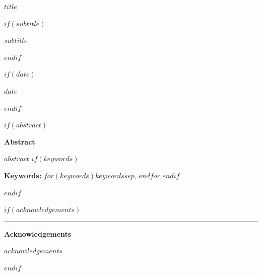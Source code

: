 \documentclass[12pt]{article}
\newif\ifjncanon
\begin{document}
\else
\begin{titlepage}
\thispagestyle{empty}

\vspace*{0.06\textheight}
\begin{center}

{\LARGE\bfseries $title$\par}

$if(subtitle)$
\vspace{0.25em}
{\large $subtitle$\par}
$endif$

\vspace{2em}

\begin{singlespace}
{\normalsize

\jncauthorblock

$if(date)$
\ifjncanon\else
\vspace{0.5em}
{\small $date$}\par
\fi
$endif$

}
\end{singlespace}

\vfill

$if(abstract)$
\begin{minipage}{0.8\textwidth}
\small\singlespacing
\textbf{Abstract}\par\vspace{0.25em}
$abstract$
$if(keywords)$
\par\vspace{1em}
\noindent\textbf{Keywords: }$for(keywords)$$keywords$$sep$, $endfor$
$endif$
\end{minipage}
$endif$

\vfill

$if(acknowledgements)$
\ifjncanon\else
\begin{minipage}{0.8\textwidth}
\footnotesize\singlespacing
\noindent\rule{0.3\textwidth}{0.4pt}\par
\textbf{Acknowledgements}\par
$acknowledgements$
\end{minipage}
\fi
$endif$

\end{center}
\end{titlepage}
\fi
\end{document}
